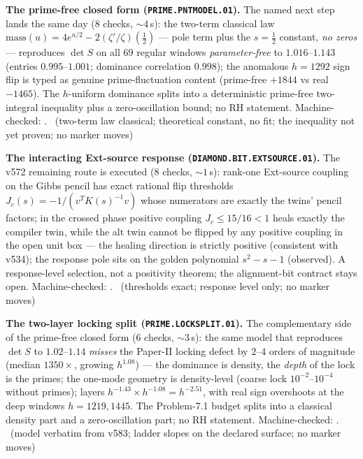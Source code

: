 \documentclass[11pt,a4paper]{article}
\theoremstyle{definition}
\begin{document}
\par\smallskip\noindent\textbf{The prime-free closed form
(\texttt{PRIME.PNTMODEL.01}).}
The named next step lands the same day ($8$ checks, ${\sim}4$\,s): the
two-term classical law
$\mathrm{mass}(u)=4e^{u/2}-2(\zeta'/\zeta)(\tfrac12)$ --- pole term
plus the $s=\tfrac12$ constant, \emph{no zeros} --- reproduces
$\det S$ on all $69$ regular windows \emph{parameter-free} to
$1.016$--$1.143$ (entries $0.995$--$1.001$; dominance correlation
$0.998$); the anomalous $h=1292$ sign flip is typed as genuine
prime-fluctuation content (prime-free $+1844$ vs real $-1465$). The
$h$-uniform dominance splits into a deterministic prime-free
two-integral inequality plus a zero-oscillation bound; no RH statement.
Machine-checked: .
\mE\ (two-term law classical; theoretical constant, no fit; the
inequality not yet proven; no marker moves)
\par\smallskip

\par\smallskip\noindent\textbf{The interacting Ext-source response
(\texttt{DIAMOND.BIT.EXTSOURCE.01}).}
The v572 remaining route is executed ($8$ checks, ${\sim}1$\,s):
rank-one Ext-source coupling on the Gibbs pencil has exact rational
flip thresholds $J_c(s)=-1/(v^{T}K(s)^{-1}v)$ whose numerators are
exactly the twins' pencil factors; in the crossed phase positive
coupling $J_c\le15/16<1$ heals exactly the compiler twin, while the
alt twin cannot be flipped by any positive coupling in the open unit
box --- the healing direction is strictly positive (consistent with
v534); the response pole sits on the golden polynomial $s^2-s-1$
(observed).  A response-level selection, not a positivity theorem; the
alignment-bit contract stays open. Machine-checked:
.
\mE\ (thresholds exact; response level only; no marker moves)
\par\smallskip

\par\smallskip\noindent\textbf{The two-layer locking split
(\texttt{PRIME.LOCKSPLIT.01}).}
The complementary side of the prime-free closed form ($6$ checks,
${\sim}3$\,s): the same model that reproduces $\det S$ to
$1.02$--$1.14$ \emph{misses} the Paper-II locking defect by $2$--$4$
orders of magnitude (median $1350\times$, growing $h^{1.08}$) --- the
dominance is density, the \emph{depth} of the lock is the primes; the
one-mode geometry is density-level (coarse lock $10^{-2}$--$10^{-4}$
without primes); layers $h^{-1.43}\times h^{-1.08}=h^{-2.51}$, with
real sign overshoots at the deep windows $h=1219,1445$.  The
Problem-7.1 budget splits into a classical density part and a
zero-oscillation part; no RH statement. Machine-checked:
.
\mE\ (model verbatim from v583; ladder slopes on the declared
surface; no marker moves)
\par\smallskip
\end{document}

